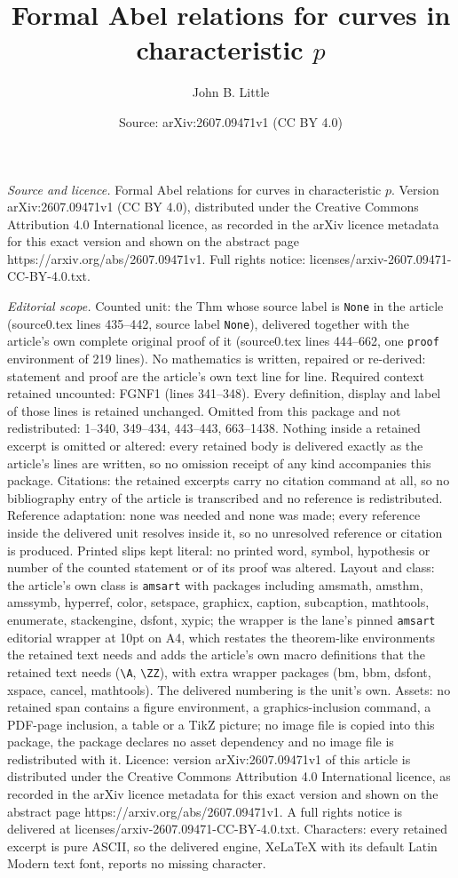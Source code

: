\documentclass[10pt,a4paper]{amsart}
\title[Formal Abel relations for curves in characteristic $p$]{Formal Abel relations for curves in characteristic $p$}
\author{John B. Little}
\date{Source: arXiv:2607.09471v1 (CC BY 4.0)}
\begin{document}
\maketitle

\noindent\emph{Source and licence.} Formal Abel relations for curves in characteristic $p$. Version arXiv:2607.09471v1 (CC BY 4.0), distributed under the Creative Commons Attribution 4.0 International licence, as recorded in the arXiv licence metadata for this exact version and shown on the abstract page https://arxiv.org/abs/2607.09471v1. Full rights notice: licenses/arxiv-2607.09471-CC-BY-4.0.txt.\par\smallskip

\noindent\textit{Editorial scope.} Counted unit: the Thm whose source label is \texttt{None} in the article (source0.tex lines 435--442, source label \texttt{None}), delivered together with the article's own complete original proof of it (source0.tex lines 444--662, one \texttt{proof} environment of 219 lines). No mathematics is written, repaired or re-derived: statement and proof are the article's own text line for line. Required context retained uncounted: FGNF1 (lines 341--348). Every definition, display and label of those lines is retained unchanged. Omitted from this package and not redistributed: 1--340, 349--434, 443--443, 663--1438. Nothing inside a retained excerpt is omitted or altered: every retained body is delivered exactly as the article's lines are written, so no omission receipt of any kind accompanies this package. Citations: the retained excerpts carry no citation command at all, so no bibliography entry of the article is transcribed and no reference is redistributed. Reference adaptation: none was needed and none was made; every reference inside the delivered unit resolves inside it, so no unresolved reference or citation is produced. Printed slips kept literal: no printed word, symbol, hypothesis or number of the counted statement or of its proof was altered. Layout and class: the article's own class is \texttt{amsart} with packages including amsmath, amsthm, amssymb, hyperref, color, setspace, graphicx, caption, subcaption, mathtools, enumerate, stackengine, dsfont, xypic; the wrapper is the lane's pinned \texttt{amsart} editorial wrapper at 10pt on A4, which restates the theorem-like environments the retained text needs and adds the article's own macro definitions that the retained text needs (\texttt{\textbackslash A}, \texttt{\textbackslash ZZ}), with extra wrapper packages (bm, bbm, dsfont, xspace, cancel, mathtools). The delivered numbering is the unit's own. Assets: no retained span contains a figure environment, a graphics-inclusion command, a PDF-page inclusion, a table or a TikZ picture; no image file is copied into this package, the package declares no asset dependency and no image file is redistributed with it. Licence: version arXiv:2607.09471v1 of this article is distributed under the Creative Commons Attribution 4.0 International licence, as recorded in the arXiv licence metadata for this exact version and shown on the abstract page https://arxiv.org/abs/2607.09471v1. A full rights notice is delivered at licenses/arxiv-2607.09471-CC-BY-4.0.txt. Characters: every retained excerpt is pure ASCII, so the delivered engine, XeLaTeX with its default Latin Modern text font, reports no missing character.
\end{document}
